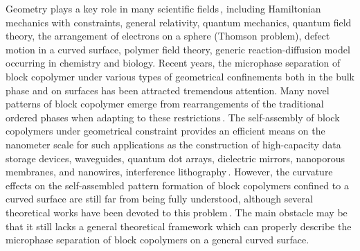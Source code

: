 \documentclass[final,1p,times]{elsarticle}
\begin{document}
Geometry plays a key role in many scientific
fields\,\cite{nakahara2003topology}, including Hamiltonian mechanics with
constraints, general relativity, quantum mechanics, quantum field theory, the
arrangement of electrons on a sphere (Thomson problem), defect motion in a curved
surface, polymer field theory, generic reaction-diffusion model occurring in
chemistry and biology.  Recent years, the microphase separation of block
copolymer under various types of geometrical confinements both in the bulk
phase and on surfaces has been attracted tremendous attention.  Many novel
patterns of block copolymer emerge from rearrangements of the traditional
ordered phases when adapting to these restrictions\,\cite{wu2004composite,
xiang2005, yu2006prl, charlotte2011interplay}.  The self-assembly of block
copolymers under geometrical constraint provides an efficient means on the
nanometer scale for such applications as the construction of high-capacity data
storage devices, waveguides, quantum dot arrays, dielectric mirrors, nanoporous
membranes, and nanowires, interference
lithography\,\cite{charlotte2011interplay, segalman2005patterning}.  However,
the curvature effects on the self-assembled pattern formation of block
copolymers confined to a curved surface are still far from being fully
understood, although several theoretical works have been devoted to this
problem\,\cite{chantawansri2007, li2014self, li2006self}.  The main obstacle
may be that it still lacks a general theoretical framework which can properly
describe the microphase separation of block copolymers on a general curved
surface.




\end{document}
